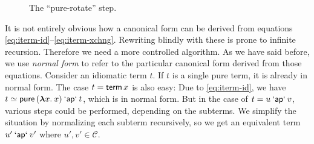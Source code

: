 \begin{figure}\centering
{}
\raisebox{10mm}{$\qquad\simeq\qquad$}
\raisebox{10mm}{$\qquad\simeq\qquad$}
\caption{The ``pure-rotate'' step.}
\label{fig:pure-rotate}
\end{figure}

It is not entirely obvious how a canonical form can be derived from equations
\eqref{eq:iterm-id}--\eqref{eq:iterm-xchng}.
Rewriting blindly with these is prone to infinite recursion.
Therefore we need a more controlled algorithm.
As we have said before, we use \emph{normal form} to refer to the particular
canonical form derived from those equations.
Consider an idiomatic term $t$.
If $t$ is a single pure term, it is already in normal form.
The case $t = \operatorname{\mathsf{term}} x$ is also easy:
Due to \eqref{eq:iterm-id}, we have $t \simeq \operatorname{\mathsf{pure}}{({\boldsymbol\lambda} x.\>x)} \mathbin{\mathsf{`ap`}} t$,
which is in normal form.
But in the case of $t = u \mathbin{\mathsf{`ap`}} v$, various steps could be performed,
depending on the subterms.
We simplify the situation by normalizing each subterm recursively, so we get
an equivalent term $u' \mathbin{\mathsf{`ap`}} v'$ where $u',v' \in \mathcal{C}$.

